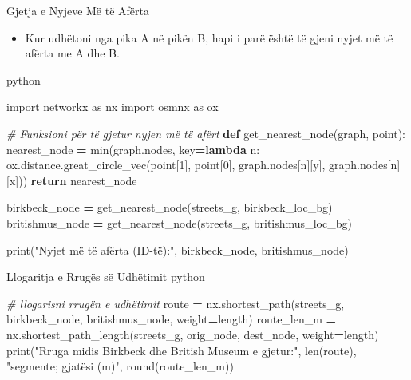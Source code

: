 \documentclass[
  ignorenonframetext,
]{beamer}
\newenvironment{Shaded}{\begin{snugshade}}{\end{snugshade}}
\newcommand{\BuiltInTok}[1]{#1}
\newcommand{\CommentTok}[1]{\textcolor[rgb]{0.56,0.35,0.01}{\textit{#1}}}
\newcommand{\ControlFlowTok}[1]{\textcolor[rgb]{0.13,0.29,0.53}{\textbf{#1}}}
\newcommand{\DecValTok}[1]{\textcolor[rgb]{0.00,0.00,0.81}{#1}}
\newcommand{\ImportTok}[1]{#1}
\newcommand{\KeywordTok}[1]{\textcolor[rgb]{0.13,0.29,0.53}{\textbf{#1}}}
\newcommand{\NormalTok}[1]{#1}
\newcommand{\OperatorTok}[1]{\textcolor[rgb]{0.81,0.36,0.00}{\textbf{#1}}}
\newcommand{\StringTok}[1]{\textcolor[rgb]{0.31,0.60,0.02}{#1}}
\providecommand{\tightlist}{%
  \setlength{\itemsep}{0pt}\setlength{\parskip}{0pt}}
\begin{document}
\begin{frame}[fragile]{Gjetja e Nyjeve Më të Afërta}
\protect\hypertarget{gjetja-e-nyjeve-muxeb-tuxeb-afuxebrta}{}
\begin{itemize}
\tightlist
\item
  Kur udhëtoni nga pika A në pikën B, hapi i parë është të gjeni nyjet
  më të afërta me A dhe B.
\end{itemize}

python

\begin{Shaded}
\begin{Highlighting}[]
\ImportTok{import}\NormalTok{ networkx }\ImportTok{as}\NormalTok{ nx}
\ImportTok{import}\NormalTok{ osmnx }\ImportTok{as}\NormalTok{ ox}

\CommentTok{\# Funksioni për të gjetur nyjen më të afërt}
\KeywordTok{def}\NormalTok{ get\_nearest\_node(graph, point):}
\NormalTok{    nearest\_node }\OperatorTok{=} \BuiltInTok{min}\NormalTok{(graph.nodes, key}\OperatorTok{=}\KeywordTok{lambda}\NormalTok{ n: ox.distance.great\_circle\_vec(point[}\DecValTok{1}\NormalTok{], point[}\DecValTok{0}\NormalTok{], graph.nodes[n][}\StringTok{\textquotesingle{}y\textquotesingle{}}\NormalTok{], graph.nodes[n][}\StringTok{\textquotesingle{}x\textquotesingle{}}\NormalTok{]))}
    \ControlFlowTok{return}\NormalTok{ nearest\_node}


\NormalTok{birkbeck\_node }\OperatorTok{=}\NormalTok{ get\_nearest\_node(streets\_g, birkbeck\_loc\_bg)}
\NormalTok{britishmus\_node }\OperatorTok{=}\NormalTok{ get\_nearest\_node(streets\_g, britishmus\_loc\_bg)}

\BuiltInTok{print}\NormalTok{(}\StringTok{"Nyjet më të afërta (ID{-}të):"}\NormalTok{, birkbeck\_node, britishmus\_node)}
\end{Highlighting}
\end{Shaded}
\end{frame}

\begin{frame}[fragile]{Llogaritja e Rrugës së Udhëtimit}
\protect\hypertarget{llogaritja-e-rruguxebs-suxeb-udhuxebtimit}{}
python

\begin{Shaded}
\begin{Highlighting}[]
\CommentTok{\# llogarisni rrugën e udhëtimit}
\NormalTok{route }\OperatorTok{=}\NormalTok{ nx.shortest\_path(streets\_g, birkbeck\_node, britishmus\_node, weight}\OperatorTok{=}\StringTok{\textquotesingle{}length\textquotesingle{}}\NormalTok{)}
\NormalTok{route\_len\_m }\OperatorTok{=}\NormalTok{ nx.shortest\_path\_length(streets\_g, orig\_node, dest\_node, weight}\OperatorTok{=}\StringTok{\textquotesingle{}length\textquotesingle{}}\NormalTok{)}
\BuiltInTok{print}\NormalTok{(}\StringTok{"Rruga midis Birkbeck dhe British Museum e gjetur:"}\NormalTok{, }\BuiltInTok{len}\NormalTok{(route), }\StringTok{"segmente; gjatësi (m)"}\NormalTok{, }\BuiltInTok{round}\NormalTok{(route\_len\_m))}
\end{Highlighting}
\end{Shaded}
\end{frame}
\end{document}
